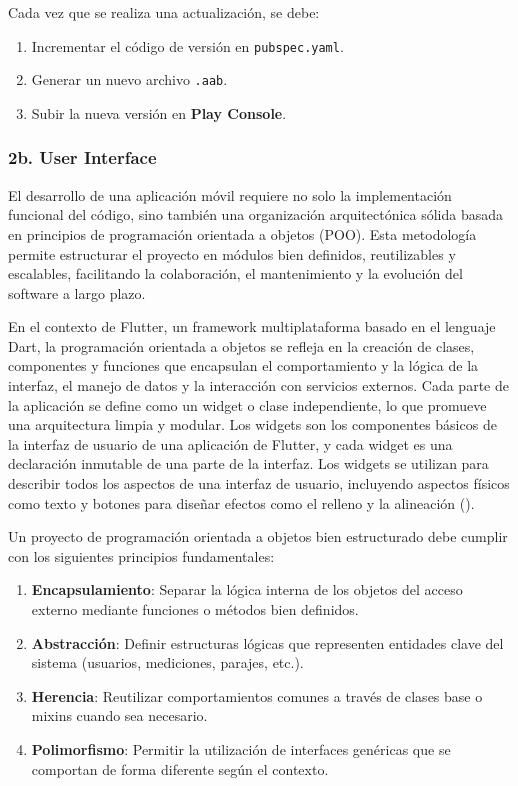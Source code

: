 Cada vez que se realiza una actualización, se debe:

\begin{enumerate}
    \item Incrementar el código de versión en \texttt{pubspec.yaml}.
    \item Generar un nuevo archivo \texttt{.aab}.
    \item Subir la nueva versión en \textbf{Play Console}.
\end{enumerate}





\subsubsection{2b. User Interface}

El desarrollo de una aplicación móvil requiere no solo la implementación funcional del código, sino también una organización arquitectónica sólida basada en principios de programación orientada a objetos (POO). Esta metodología permite estructurar el proyecto en módulos bien definidos, reutilizables y escalables, facilitando la colaboración, el mantenimiento y la evolución del software a largo plazo.

En el contexto de Flutter, un framework multiplataforma basado en el lenguaje Dart, la programación orientada a objetos se refleja en la creación de clases, componentes y funciones que encapsulan el comportamiento y la lógica de la interfaz, el manejo de datos y la interacción con servicios externos. Cada parte de la aplicación se define como un widget o clase independiente, lo que promueve una arquitectura limpia y modular. Los widgets son los componentes básicos de la interfaz de usuario de una aplicación de Flutter, y cada widget es una declaración inmutable de una parte de la interfaz. Los widgets se utilizan para describir todos los aspectos de una interfaz de usuario, incluyendo aspectos físicos como texto y botones para diseñar efectos como el relleno y la alineación (\cite{flutter_multiplataforma}).

Un proyecto de programación orientada a objetos bien estructurado debe cumplir con los siguientes principios fundamentales:

\begin{enumerate}
    \item \textbf{Encapsulamiento}: Separar la lógica interna de los objetos del acceso externo mediante funciones o métodos bien definidos.
    \item \textbf{Abstracción}: Definir estructuras lógicas que representen entidades clave del sistema (usuarios, mediciones, parajes, etc.).
    \item \textbf{Herencia}: Reutilizar comportamientos comunes a través de clases base o mixins cuando sea necesario.
    \item \textbf{Polimorfismo}: Permitir la utilización de interfaces genéricas que se comportan de forma diferente según el contexto.
\end{enumerate}




